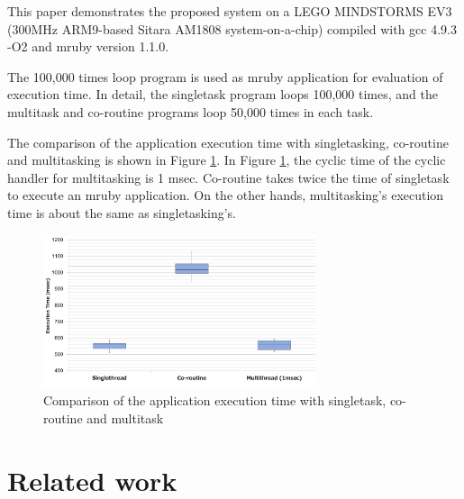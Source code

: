 \documentclass[conference,compsoc]{IEEEtran}
\begin{document}
This paper demonstrates the proposed system on a LEGO MINDSTORMS EV3 (300MHz ARM9-based Sitara AM1808 system-on-a-chip) compiled with gcc 4.9.3 -O2 and mruby version 1.1.0.

The 100,000 times loop program is used as mruby application for evaluation of execution time.
In detail, the singletask program loops 100,000 times, and the multitask and co-routine programs loop 50,000 times in each task.

The comparison of the application execution time with singletasking, co-routine and multitasking is shown in Figure \ref{fig:comparison_s_c_m}.
In Figure \ref{fig:comparison_s_c_m}, the cyclic time of the cyclic handler for multitasking is 1 msec.
Co-routine takes twice the time of singletask to execute an mruby application.
On the other hands, multitasking's execution time is about the same as singletasking's.

\begin{figure}[t]
    \centering
    \includegraphics[width=8cm,clip]{figure/comparison_s_c_m.pdf}
    \caption{Comparison of the application execution time with singletask, co-routine and multitask}
    \label{fig:comparison_s_c_m}
\end{figure}

\section{Related work}
\label{sec:Related work}
\end{document}
